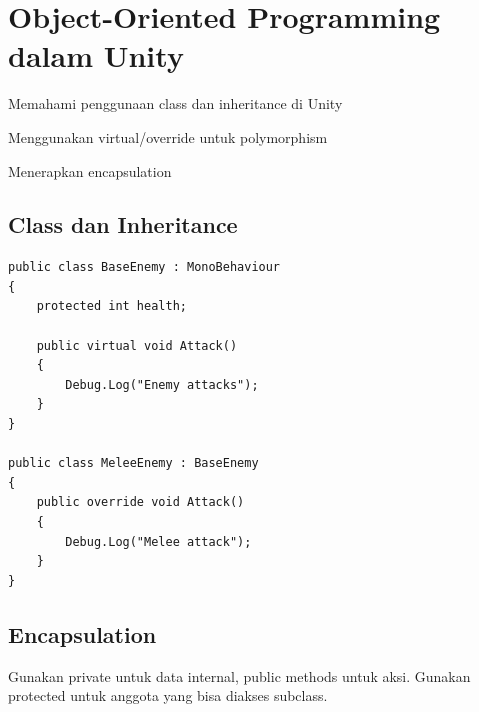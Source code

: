 \section{Object-Oriented Programming dalam Unity}

\begin{learningoutcomes}
\item Memahami penggunaan class dan inheritance di Unity
\item Menggunakan virtual/override untuk polymorphism
\item Menerapkan encapsulation
\end{learningoutcomes}

\subsection{Class dan Inheritance}

\begin{lstlisting}[language={[Sharp]C}]
public class BaseEnemy : MonoBehaviour
{
    protected int health;
    
    public virtual void Attack()
    {
        Debug.Log("Enemy attacks");
    }
}

public class MeleeEnemy : BaseEnemy
{
    public override void Attack()
    {
        Debug.Log("Melee attack");
    }
}
\end{lstlisting}

\subsection{Encapsulation}

Gunakan private untuk data internal, public methods untuk aksi. Gunakan protected untuk anggota yang bisa diakses subclass.
